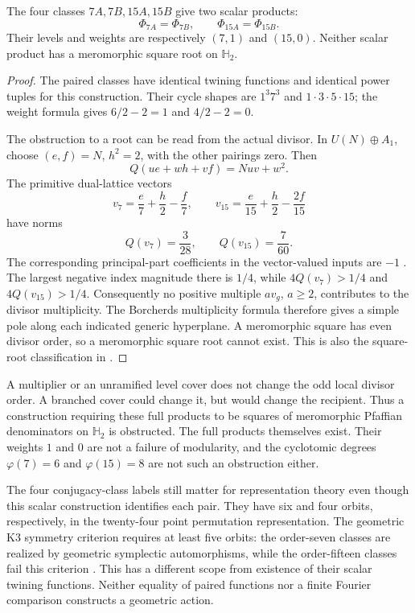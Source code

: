 \begin{theorem}
\label{conj:order-seven-fifteen-twined-denominators}
The four classes \(7A,7B,15A,15B\) give two scalar products:
\[
 \Phi_{7A}=\Phi_{7B},\qquad \Phi_{15A}=\Phi_{15B}.
\]
Their levels and weights are respectively \((7,1)\) and
\((15,0)\). Neither scalar product has a meromorphic square root
on \(\mathbb H_2\).
\end{theorem}
\begin{proof}
The paired classes have identical twining functions and identical
power tuples for this construction. Their cycle shapes are
\(1^3 7^3\) and \(1\cdot3\cdot5\cdot15\); the weight formula
gives \(6/2-2=1\) and \(4/2-2=0\).

The obstruction to a root can be read from the actual divisor.
In \(U(N)\oplus A_1\), choose \((e,f)=N\), \(h^2=2\),
with the other pairings zero. Then
\[
 Q(ue+wh+vf)=Nuv+w^2.
\]
The primitive dual-lattice vectors
\[
 v_7=\frac e7+\frac h2-\frac f7,
 \qquad
 v_{15}=\frac e{15}+\frac h2-\frac{2f}{15}
\]
have norms
\[
 Q(v_7)=\frac3{28},\qquad Q(v_{15})=\frac7{60}.
\]
The corresponding principal-part coefficients in the vector-valued
inputs are \(-1\) \cite[Appendix~A]{WangWilliamsMathieu}.
The largest negative index magnitude there is \(1/4\), while
\(4Q(v_7)>1/4\) and \(4Q(v_{15})>1/4\). Consequently no
positive multiple \(a v_g\), \(a\ge2\), contributes to the
divisor multiplicity. The Borcherds multiplicity formula therefore
gives a simple pole along each indicated generic hyperplane.
A meromorphic square has even divisor order, so a meromorphic
square root cannot exist. This is also the square-root
classification in \cite[Theorem~1.3(2)]{WangWilliamsMathieu}.
\end{proof}

\begin{remark}
\label{rem:order-seven-fifteen-cross-checks}
A multiplier or an unramified level cover does not change the odd
local divisor order. A branched cover could change it, but would
change the recipient. Thus a construction requiring these full
products to be squares of meromorphic Pfaffian denominators on
\(\mathbb H_2\) is obstructed. The full products themselves
exist. Their weights \(1\) and \(0\) are not a failure of
modularity, and the cyclotomic degrees \(\varphi(7)=6\) and
\(\varphi(15)=8\) are not such an obstruction either.
\end{remark}

The four conjugacy-class labels still matter for representation
theory even though this scalar construction identifies each pair.
They have six and four orbits, respectively, in the twenty-four
point permutation representation. The geometric K3 symmetry
criterion requires at least five orbits: the order-seven classes
are realized by geometric symplectic automorphisms, while the
order-fifteen classes fail this criterion
\cite[\S2.1]{GaberdielVolpatoOrbifoldK3}. This has a different
scope from existence of their scalar twining functions.
Neither equality of paired functions nor a finite
Fourier comparison constructs a geometric action.

